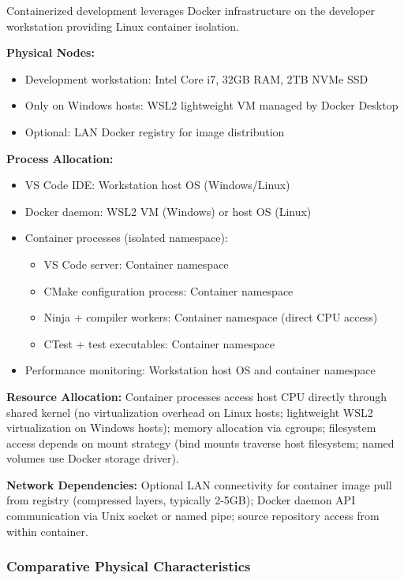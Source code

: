Containerized development leverages Docker infrastructure on the developer workstation providing Linux container isolation.

\textbf{Physical Nodes:}
\begin{itemize}
\item Development workstation: Intel Core i7, 32GB RAM, 2TB NVMe SSD
\item Only on Windows hosts: WSL2 lightweight VM managed by Docker Desktop
\item Optional: LAN Docker registry for image distribution
\end{itemize}

\textbf{Process Allocation:}
\begin{itemize}
\item VS Code IDE: Workstation host OS (Windows/Linux)
\item Docker daemon: WSL2 VM (Windows) or host OS (Linux)
\item Container processes (isolated namespace):
  \begin{itemize}
  \item VS Code server: Container namespace
  \item CMake configuration process: Container namespace
  \item Ninja + compiler workers: Container namespace (direct CPU access)
  \item CTest + test executables: Container namespace
  \end{itemize}
\item Performance monitoring: Workstation host OS and container namespace
\end{itemize}

\textbf{Resource Allocation:} Container processes access host CPU directly through shared kernel (no virtualization overhead on Linux hosts; lightweight WSL2 virtualization on Windows hosts); memory allocation via cgroups; filesystem access depends on mount strategy (bind mounts traverse host filesystem; named volumes use Docker storage driver).

\textbf{Network Dependencies:} Optional LAN connectivity for container image pull from registry (compressed layers, typically 2-5GB); Docker daemon API communication via Unix socket or named pipe; source repository access from within container.

\subsubsection{Comparative Physical Characteristics}

